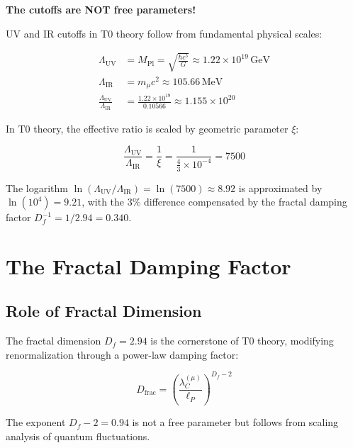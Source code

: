\documentclass[12pt,a4paper]{article}
\theoremstyle{definition}
\begin{document}
	\begin{tcolorbox}[colback=blue!5!white,colframe=blue!75!black]
		\textbf{The cutoffs are NOT free parameters!}
	\end{tcolorbox}
	
	UV and IR cutoffs in T0 theory follow from fundamental physical scales:
	
	\begin{align}
		\Lambda_{\mathrm{UV}} &= M_{\mathrm{Pl}} = \sqrt{\frac{\hbar c^5}{G}} \approx 1.22 \times 10^{19}\,\mathrm{GeV} \\
		\Lambda_{\mathrm{IR}} &= m_\mu c^2 \approx 105.66\,\mathrm{MeV} \\
		\frac{\Lambda_{\mathrm{UV}}}{\Lambda_{\mathrm{IR}}} &= \frac{1.22 \times 10^{19}}{0.10566} \approx 1.155 \times 10^{20}
	\end{align}
	
	In T0 theory, the effective ratio is scaled by geometric parameter $\xi$:
	
	\begin{equation}
		\frac{\Lambda_{\mathrm{UV}}}{\Lambda_{\mathrm{IR}}} = \frac{1}{\xi} = \frac{1}{\frac{4}{3} \times 10^{-4}} = 7500
	\end{equation}
	
	The logarithm $\ln(\Lambda_{\mathrm{UV}}/\Lambda_{\mathrm{IR}}) = \ln(7500) \approx 8.92$ is approximated by $\ln(10^4) = 9.21$, with the 3\% difference compensated by the fractal damping factor $D_f^{-1} = 1/2.94 = 0.340$.
	
	\section{The Fractal Damping Factor}
	
	\subsection{Role of Fractal Dimension}
	
	The fractal dimension $D_f = 2.94$ is the cornerstone of T0 theory, modifying renormalization through a power-law damping factor:
	
	\begin{equation}
		D_{\text{frac}} = \left(\frac{\lambda_C^{(\mu)}}{\ell_P}\right)^{D_f - 2}
	\end{equation}
	
	The exponent $D_f - 2 = 0.94$ is not a free parameter but follows from scaling analysis of quantum fluctuations.
	
\end{document}
